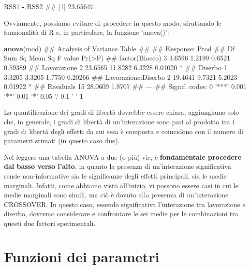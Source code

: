 \documentclass[a4paper,12pt,oneside]{book}
\newenvironment{Shaded}{\begin{snugshade}}{\end{snugshade}}
\newcommand{\KeywordTok}[1]{\textcolor[rgb]{0.13,0.29,0.53}{\textbf{#1}}}
\newcommand{\StringTok}[1]{\textcolor[rgb]{0.31,0.60,0.02}{#1}}
\newcommand{\OperatorTok}[1]{\textcolor[rgb]{0.81,0.36,0.00}{\textbf{#1}}}
\newcommand{\NormalTok}[1]{#1}
\theoremstyle{definition}
\theoremstyle{definition}
\theoremstyle{definition}
\theoremstyle{remark}
\begin{document}
\begin{Shaded}
\begin{Highlighting}[]
\NormalTok{RSS1 }\OperatorTok{-}\StringTok{ }\NormalTok{RSS2}
\NormalTok{## [1] 23.65647}
\end{Highlighting}
\end{Shaded}

Ovviamente, possiamo evitare di procedere in questo modo, sfruttando le
funzionalità di R e, in particolare, la funzione `anova()':

\begin{Shaded}
\begin{Highlighting}[]
\KeywordTok{anova}\NormalTok{(mod)}
\NormalTok{## Analysis of Variance Table}
\NormalTok{## }
\NormalTok{## Response: Prod}
\NormalTok{##                     Df  Sum Sq Mean Sq F value  Pr(>F)  }
\NormalTok{## factor(Blocco)       3  3.6596  1.2199  0.6521 0.59389  }
\NormalTok{## Lavorazione          2 23.6565 11.8282  6.3228 0.01020 *}
\NormalTok{## Diserbo              1  3.3205  3.3205  1.7750 0.20266  }
\NormalTok{## Lavorazione:Diserbo  2 19.4641  9.7321  5.2023 0.01922 *}
\NormalTok{## Residuals           15 28.0609  1.8707                  }
\NormalTok{## ---}
\NormalTok{## Signif. codes:  0 '***' 0.001 '**' 0.01 '*' 0.05 '.' 0.1 ' ' 1}
\end{Highlighting}
\end{Shaded}

La quantificazione dei gradi di libertà dovrebbe essere chiara;
aggiungiamo solo che, in generale, i gradi di libertà di un'interazione
sono pari al prodotto tra i gradi di libertà degli effetti da cui essa è
composta e coincidono con il numero di parametri stimati (in questo caso
due).

Nel leggere una tabella ANOVA a due (o più) vie, è \textbf{fondamentale
procedere dal basso verso l'alto}, in quanto la presenza di
un'interazione significativa rende non-informative sia le significanze
degli effetti principali, sia le medie marginali. Infatti, come abbiamo
visto all'inizio, vi possono essere casi in cui le medie marginali sono
simili, ma ciò è dovuto alla presenza di un'interazione CROSSOVER. In
questo caso, essendo significativa l'interazione tra lavorazione e
diserbo, dovremo considerare e confrontare le sei medie per le
combinazioni tra questi due fattori sperimentali.

\section{Funzioni dei parametri}\label{funzioni-dei-parametri}
\end{document}
